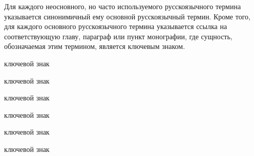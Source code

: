 \bigskip

Для каждого неосновного, но часто используемого русскоязычного термина указывается синонимичный ему основной русскоязычный термин. Кроме того, для каждого основного русскоязычного термина указывается ссылка на соответствующую главу, параграф или пункт монографии, где сущность, обозначаемая этим термином, является ключевым знаком.

\bigskip

\begin{SCn}

\begin{scnreltolist}{ключевой знак}
\end{scnreltolist}

\begin{scnreltolist}{ключевой знак}
\end{scnreltolist}	

\begin{scnreltolist}{ключевой знак}
\end{scnreltolist}

\begin{scnreltolist}{ключевой знак}
\end{scnreltolist}

\begin{scnreltolist}{ключевой знак}
\end{scnreltolist}


\bigskip
\bigskip
\bigskip
	
\begin{scnreltolist}{ключевой знак}
\end{scnreltolist}

\end{SCn}	